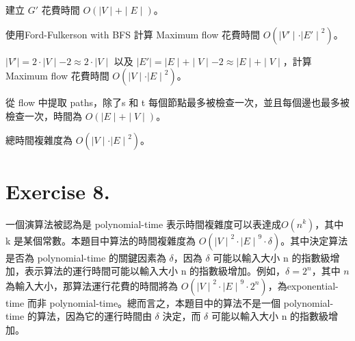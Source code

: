 \documentclass[UTF8, a4paper, 11pt]{report}
\begin{document}
建立 $G'$ 花費時間 $O(\mid V\mid + \mid E\mid)$。

使用Ford-Fulkerson with BFS 計算 Maximum flow 花費時間 $O(\mid V'\mid \cdot {\mid E'\mid}^2)$。

$\mid V'\mid = 2 \cdot \mid V\mid - 2 \approx 2 \cdot \mid V\mid$ 以及 $\mid E'\mid = \mid E\mid + \mid V\mid - 2 \approx \mid E\mid + \mid V\mid$，計算 Maximum flow 花費時間 $O(\mid V\mid \cdot {\mid E\mid}^2)$。

從 flow 中提取 paths，除了s 和 t 每個節點最多被檢查一次，並且每個邊也最多被檢查一次，時間為 $O(\mid E\mid + \mid V\mid)$。

總時間複雜度為 $O(\mid V\mid \cdot {\mid E\mid}^2)$。

\section*{Exercise 8.}

一個演算法被認為是 polynomial-time 表示時間複雜度可以表達成$O(n^k)$，其中 k 是某個常數。本題目中算法的時間複雜度為 $O({\mid V\mid}^2 \cdot {\mid E\mid}^9 \cdot \delta)$。其中決定算法是否為 polynomial-time 的關鍵因素為 $\delta$，因為 $\delta$ 可能以輸入大小 n 的指數級增加，表示算法的運行時間可能以輸入大小 n 的指數級增加。例如，$\delta = 2 ^ n$，其中 $n$ 為輸入大小，那算法運行花費的時間將為 $O({\mid V\mid}^2 \cdot {\mid E\mid}^9 \cdot 2 ^ n)$，為exponential-time 而非 polynomial-time。總而言之，本題目中的算法不是一個 polynomial-time 的算法，因為它的運行時間由 $\delta$ 決定，而 $\delta$ 可能以輸入大小 n 的指數級增加。
\end{document}
